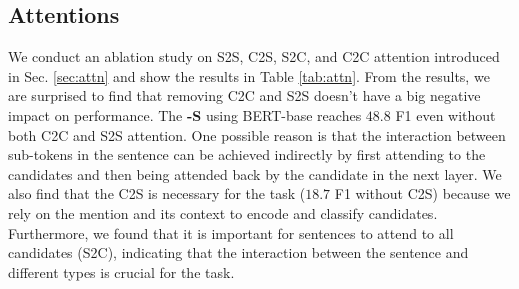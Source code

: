 \subsection{Attentions}
We conduct an ablation study on S2S, C2S, S2C, and C2C attention introduced in Sec. \ref{sec:attn} and show the results in Table \ref{tab:attn}. From the results, we are surprised to find that removing C2C and S2S doesn't have a big negative impact on performance. The {\bf \textsc{\name-S}} using BERT-base reaches $48.8$ F1 even without both C2C and S2S attention. One possible reason is that the interaction between sub-tokens in the sentence can be achieved indirectly by first attending to the candidates and then being attended back by the candidate in the next layer. We also find that the C2S is necessary for the task ($18.7$ F1 without C2S) because we rely on the mention and its context to encode and classify candidates. Furthermore, we found that it is important for sentences to attend to all candidates (S2C), indicating that the interaction between the sentence and different types is crucial for the task.

\begin{table}[t]
\centering
{}
\caption{Attention analysis.}
\label{tab:attn}
\end{table}










